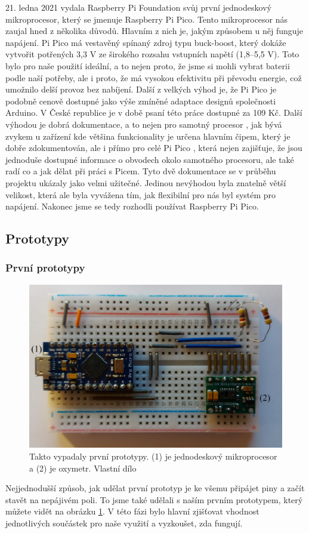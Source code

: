 \par 21. ledna 2021 vydala Raspberry Pi Foundation svůj první jednodeskový mikroprocesor, který se jmenuje Raspberry Pi Pico. Tento mikroprocesor nás zaujal hned z několika důvodů. Hlavním z nich je, jakým způsobem u něj funguje napájení. Pi Pico má vestavěný spínaný zdroj typu buck-boost, který dokáže vytvořit potřených 3,3 V ze širokého rozsahu vstupních napětí (1,8–5,5 V). Toto bylo pro naše použití ideální, a to nejen proto, že jsme si mohli vybrat baterii podle naší potřeby, ale i proto, že má vysokou efektivitu při převodu energie, což umožnilo delší provoz bez nabíjení. Další z velkých výhod je, že Pi Pico je podobně cenově dostupné jako výše zmíněné adaptace designů společnosti Arduino. V České republice je v době psaní této práce dostupné za 109 Kč. Další výhodou je dobrá dokumentace, a to nejen pro samotný procesor \citep{rp2040DS}, jak bývá zvykem u zařízení kde většina funkcionality je určena hlavním čipem, který je dobře zdokumentován, ale i přímo pro celé Pi Pico \citep{picoDS}, která nejen zajišťuje, že jsou jednoduše dostupné informace o obvodech okolo samotného procesoru, ale také radí co a jak dělat při práci s Picem. Tyto dvě dokumentace se v průběhu projektu ukázaly jako velmi užitečné. Jedinou nevýhodou byla znatelně větší velikost, která ale byla vyvážena tím, jak flexibilní pro nás byl systém pro napájení. Nakonec jsme se tedy rozhodli používat Raspberry Pi Pico.
\subsection {Prototypy}
\subsubsection {První prototypy}
\begin{figure}[ht]
  \includegraphics[scale=0.27, center]{Kapitoly/Prakticka/Obrazky/První_prototypy.png}
  \caption [První prototyp]{Takto vypadaly první prototypy. (1) je jednodeskový mikroprocesor a (2) je oxymetr. Vlastní dílo}
  \label{fig:První_prototyp}
\end{figure}
Nejjednodušší způsob, jak udělat první prototyp je ke všemu připájet piny a začít stavět na nepájivém poli. To jsme také udělali s naším prvním prototypem, který můžete vidět na obrázku \ref{fig:První_prototyp}. V této fázi bylo hlavní zjišťovat vhodnost jednotlivých součástek pro naše využití a vyzkoušet, zda fungují.
